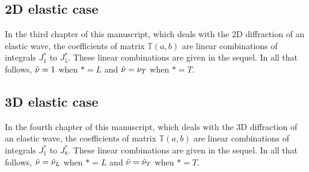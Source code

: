 \subsection{2D elastic case}
\label{finalT2D}
In the third chapter of this manuscript, which deals with the 2D diffraction of an elastic wave, the coefficients of matrix $\mathbb{T}(a,b)$ are linear combinations of integrals $J_1^*$ to $J_5^*$. These linear combinations are given in the sequel. In all that follows, $\tilde{\nu}=1$ when $*=L$ and $\tilde{\nu}=\nu_T$ when $*=T$.
\subsection{3D elastic case}
\label{finalT3D}
In the fourth chapter of this manuscript, which deals with the 3D diffraction of an elastic wave, the coefficients of matrix $\mathbb{T}(a,b)$ are linear combinations of integrals $J_1^*$ to $J_8^*$. These linear combinations are given in the sequel. In all that follows, $\tilde{\nu}=\tilde{\nu}_L$ when $*=L$ and $\tilde{\nu}=\tilde{\nu}_T$ when $*=T$.
